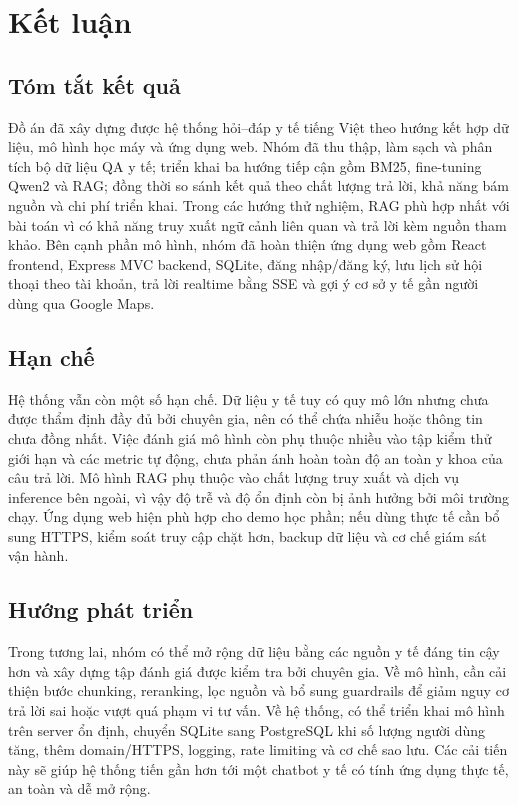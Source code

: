 \chapter{Kết luận}
\label{chap:conclusion}

\section{Tóm tắt kết quả}
Đồ án đã xây dựng được hệ thống hỏi--đáp y tế tiếng Việt theo hướng kết hợp dữ liệu, mô hình học máy và ứng dụng web. Nhóm đã thu thập, làm sạch và phân tích bộ dữ liệu QA y tế; triển khai ba hướng tiếp cận gồm BM25, fine-tuning Qwen2 và RAG; đồng thời so sánh kết quả theo chất lượng trả lời, khả năng bám nguồn và chi phí triển khai. Trong các hướng thử nghiệm, RAG phù hợp nhất với bài toán vì có khả năng truy xuất ngữ cảnh liên quan và trả lời kèm nguồn tham khảo. Bên cạnh phần mô hình, nhóm đã hoàn thiện ứng dụng web gồm React frontend, Express MVC backend, SQLite, đăng nhập/đăng ký, lưu lịch sử hội thoại theo tài khoản, trả lời realtime bằng SSE và gợi ý cơ sở y tế gần người dùng qua Google Maps.

\section{Hạn chế}
Hệ thống vẫn còn một số hạn chế. Dữ liệu y tế tuy có quy mô lớn nhưng chưa được thẩm định đầy đủ bởi chuyên gia, nên có thể chứa nhiễu hoặc thông tin chưa đồng nhất. Việc đánh giá mô hình còn phụ thuộc nhiều vào tập kiểm thử giới hạn và các metric tự động, chưa phản ánh hoàn toàn độ an toàn y khoa của câu trả lời. Mô hình RAG phụ thuộc vào chất lượng truy xuất và dịch vụ inference bên ngoài, vì vậy độ trễ và độ ổn định còn bị ảnh hưởng bởi môi trường chạy. Ứng dụng web hiện phù hợp cho demo học phần; nếu dùng thực tế cần bổ sung HTTPS, kiểm soát truy cập chặt hơn, backup dữ liệu và cơ chế giám sát vận hành.

\section{Hướng phát triển}
Trong tương lai, nhóm có thể mở rộng dữ liệu bằng các nguồn y tế đáng tin cậy hơn và xây dựng tập đánh giá được kiểm tra bởi chuyên gia. Về mô hình, cần cải thiện bước chunking, reranking, lọc nguồn và bổ sung guardrails để giảm nguy cơ trả lời sai hoặc vượt quá phạm vi tư vấn. Về hệ thống, có thể triển khai mô hình trên server ổn định, chuyển SQLite sang PostgreSQL khi số lượng người dùng tăng, thêm domain/HTTPS, logging, rate limiting và cơ chế sao lưu. Các cải tiến này sẽ giúp hệ thống tiến gần hơn tới một chatbot y tế có tính ứng dụng thực tế, an toàn và dễ mở rộng.
